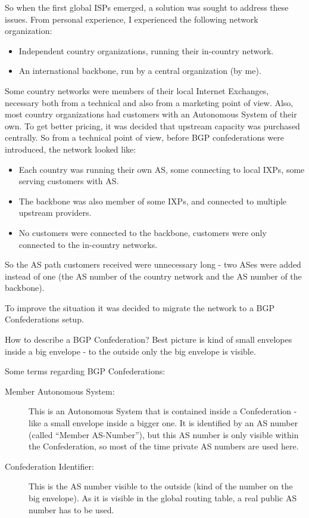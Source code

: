 So when the first global ISPs emerged, a solution was sought to address these issues. From personal experience, I experienced the following network organization:
\begin{itemize}
  \item Independent country organizations, running their in-country network.
  \item An international backbone, run by a central organization (by me).
\end{itemize}
Some country networks were members of their local Internet Exchanges, necessary both from a technical and also from a marketing point of view. Also, most country organizations had customers with an Autonomous System of their own. To get better pricing, it was decided that upstream capacity was purchased centrally. So from a technical point of view, before BGP confederations were introduced, the network looked like:
\begin{itemize}
  \item Each country was running their own AS, some connecting to local IXPs, some serving customers with AS.
  \item The backbone was also member of some IXPs, and connected to multiple upstream providers.
  \item No customers were connected to the backbone, customers were only connected to the in-country networks.
\end{itemize}
So the AS path customers received were unnecessary long - two ASes were added instead of one (the AS number of the country network and the AS number of the backbone).

To improve the situation it was decided to migrate the network to a BGP Confederations setup.

How to describe a BGP Confederation? Best picture is kind of small envelopes inside a big envelope - to the outside only the big envelope is visible.

Some terms regarding BGP Confederations:
\begin{description}
  \item[Member Autonomous System:] This is an Autonomous System that is contained inside a Confederation - like a small envelope inside a bigger one. It is identified by an AS number (called ``Member AS-Number''), but this AS number is only visible within the Confederation, so most of the time private AS numbers are used here.
  \item[Confederation Identifier:] This is the AS number visible to the outside (kind of the number on the big envelope). As it is visible in the global routing table, a real public AS number has to be used.
\end{description}

